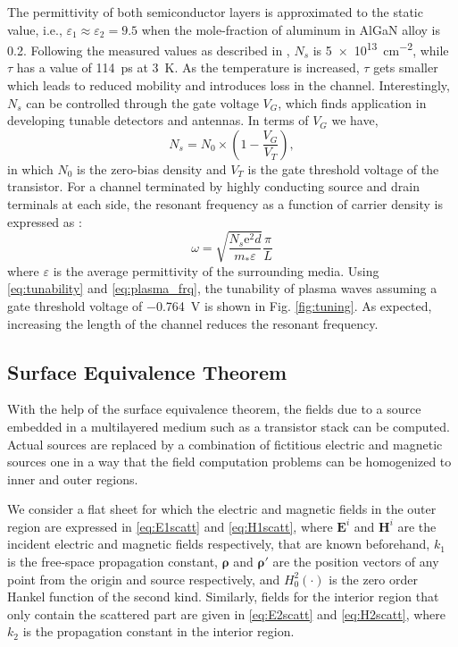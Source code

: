 \documentclass{ieeeaccess}
\renewcommand{\v}[1]{\mathbf{#1}} %
\renewcommand{\O}{\omega}  %
\newcommand{\E}{\varepsilon}  %
\newcommand{\p}{\rho}  %
\newcommand{\vp}{\boldsymbol \p}  %
\renewcommand{\^}{\hat}  %
\newcommand{\e}{\mathrm{e}} %
\begin{document}
The permittivity of both semiconductor layers is approximated to the static value, i.e., $\E_1 \approx \E_2 = 9.5$ when the mole-fraction of aluminum in AlGaN alloy is 0.2. Following the measured values as described in \cite{Muravjov2010}, $N_s$  is \SI{5e13}{\cm^{-2}}, while $\tau$ has a value of \SI{114}{\ps} at \SI{3}{\kelvin}. As the temperature is increased, $\tau$ gets smaller which leads to reduced mobility and introduces loss in the channel. Interestingly, $N_s$ can be controlled through the gate voltage $V_G$, which finds application in developing tunable detectors and antennas. In terms of $V_G$ we have,
%
\setcounter{equation}{12}
\begin{equation}
  N_s = N_0 \times \left(1 - \frac{V_G}{V_T} \right),
  \label{eq:tunability}
\end{equation}
%
in which $N_0$ is the zero-bias density and $V_T$ is the gate threshold voltage of the transistor. For a channel terminated by highly conducting source and drain terminals at each side, the resonant frequency as a function of carrier density is expressed as \cite{Popov2008}:
%
\begin{equation}
  \O = \sqrt{\frac{N_s \e^2 d}{m_{\ast} \E}} \frac{\pi}{L}
  \label{eq:plasma_frq}
\end{equation}
%
where $\E$ is the average permittivity of the surrounding media. Using \eqref{eq:tunability} and \eqref{eq:plasma_frq}, the tunability of plasma waves assuming a gate threshold voltage of \SI{-.764}{\volt} is shown in Fig. \ref{fig:tuning}. As expected, increasing the length of the channel reduces the resonant frequency.



\subsection{Surface Equivalence Theorem}
%
With the help of the surface equivalence theorem, the fields due to a source embedded in a multilayered medium such as a transistor stack can be computed. Actual sources are replaced by a combination of fictitious electric and magnetic sources one in a way that the field computation problems can be homogenized to inner and outer regions. 

We consider a flat sheet for which the electric and magnetic fields in the outer region are expressed in \eqref{eq:E1scatt} and \eqref{eq:H1scatt}, where $\v E^i$ and $\v H^i$ are the incident electric and magnetic fields respectively, that are known beforehand, $k_1$ is the free-space propagation constant, $\vp$ and $\vp'$ are the position vectors of any point from the origin and source respectively, and $H_0^2(\cdot)$ is the zero order Hankel function of the second kind.  Similarly, fields for the interior region that only contain the scattered part are given in \eqref{eq:E2scatt} and \eqref{eq:H2scatt}, where $k_2$ is the propagation constant in the interior region.
%
\end{document}
